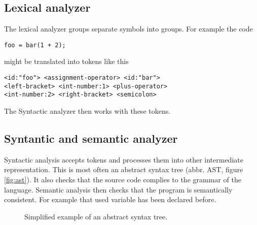 \subsection{Lexical analyzer}
The lexical analyzer groups separate symbols into groups. For example the code
\begin{verbatim}
foo = bar(1 + 2);
\end{verbatim}
might be translated into tokens like this
\begin{lstlisting}[stringstyle=\color{black}]
<id:"foo"> <assignment-operator> <id:"bar"> 
<left-bracket> <int-number:1> <plus-operator> 
<int-number:2> <right-bracket> <semicolon>
\end{lstlisting}
The Syntactic analyzer then works with these tokens.

\subsection{Syntantic and semantic analyzer}
Syntactic analysis accepts tokens and processes them into other intermediate representation. This is
most often an abstract syntax tree (abbr. AST, figure \ref{fig:ast}). It also checks that the source code complies to the grammar of the language.
Semantic analysis then checks that the program is semantically consistent. For example that used variable
has been declared before.

\begin{figure}\label{fig:ast}
    \centering
    \caption{Simplified example of an abstract syntax tree.}
    \label{fig:astgraph}
\end{figure}
 
